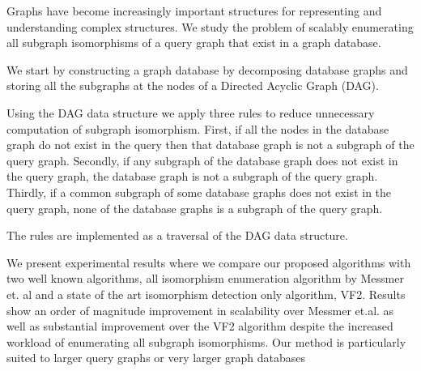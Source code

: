 
Graphs have become increasingly important structures for representing and understanding complex structures.
We study the problem of scalably enumerating all subgraph isomorphisms of a query graph that exist in a graph database.

We start by constructing a graph database by decomposing database graphs and storing all the subgraphs at the nodes of a Directed Acyclic Graph (DAG).

Using the DAG data structure we apply three rules to reduce unnecessary computation of subgraph isomorphism. First, if all the nodes in the database graph do not exist in the query then that database graph is not a subgraph of the query graph. Secondly, if any subgraph of the database graph does not exist in the query graph, the database graph is not a subgraph of the query graph. Thirdly, if a common subgraph of some database graphs does not exist in the query graph, none of the database graphs is a subgraph of the query graph.

The rules are implemented as a traversal of the DAG data structure. 

We present experimental results where we compare our proposed algorithms with two well known algorithms, all isomorphism enumeration algorithm by Messmer et. al and a state of the art isomorphism detection only algorithm, VF2. Results show an order of magnitude improvement in scalability over Messmer et.al. as well as substantial improvement over the VF2 algorithm despite the increased workload of enumerating all subgraph isomorphisms. Our method is particularly suited to larger query graphs or very larger graph databases


